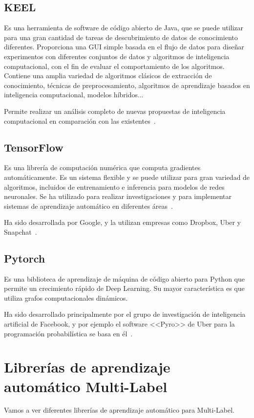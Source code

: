 \subsection{KEEL}
Es una herramienta de software de código abierto de Java, que se puede utilizar para una gran cantidad de tareas de descubrimiento de datos de conocimiento diferentes. Proporciona una GUI simple basada en el flujo de datos para diseñar experimentos con diferentes conjuntos de datos y algoritmos de inteligencia computacional, con el fin de evaluar el comportamiento de los algoritmos. Contiene una amplia variedad de algoritmos clásicos de extracción de conocimiento, técnicas de preprocesamiento, algoritmos de aprendizaje basados en inteligencia computacional, modelos híbridos...

Permite realizar un análisis completo de nuevas propuestas de inteligencia computacional en comparación con las existentes~\cite{keel}.

\subsection{TensorFlow}
Es una librería de computación numérica que computa gradientes automáticamente. Es un sistema flexible y se puede utilizar para gran variedad de algoritmos, incluidos de entrenamiento e inferencia para modelos de redes neuronales. Se ha utilizado para realizar investigaciones y para implementar sistemas de aprendizaje automático en diferentes áreas~\cite{tensorflow}.

Ha sido desarrollada por Google, y la utilizan empresas como Dropbox, Uber y Snapchat~\cite{libraries}.

\subsection{Pytorch}
Es una biblioteca de aprendizaje de máquina de código abierto para Python que permite un crecimiento rápido de Deep Learning. Su mayor característica es que utiliza grafos computacionales dinámicos.

Ha sido desarrollado principalmente por el grupo de investigación de inteligencia artificial de Facebook, y por ejemplo el software <<Pyro>> de Uber para la programación probabilística se basa en él~\cite{wiki:pytorch}.

\section{Librerías de aprendizaje automático Multi-Label}
Vamos a ver diferentes librerías de aprendizaje automático para Multi-Label.
